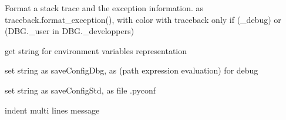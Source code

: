 \documentclass[a4paper,10pt,english]{sphinxmanual}
\begin{document}

\begin{fulllineitems}
\label{\detokenize{apidoc_src/src:src.debug.format_color_exception}}
Format a stack trace and the exception information.
as traceback.format\_exception(), with color
with traceback only if (\_debug) or (DBG.\_user in DBG.\_developpers)

\end{fulllineitems}


\begin{fulllineitems}
\label{\detokenize{apidoc_src/src:src.debug.getLocalEnv}}
get string for environment variables representation

\end{fulllineitems}


\begin{fulllineitems}
\label{\detokenize{apidoc_src/src:src.debug.getStrConfigDbg}}
set string as saveConfigDbg, 
as (path expression evaluation) for debug

\end{fulllineitems}


\begin{fulllineitems}
\label{\detokenize{apidoc_src/src:src.debug.getStrConfigStd}}
set string as saveConfigStd, 
as file .pyconf

\end{fulllineitems}


\begin{fulllineitems}
\label{\detokenize{apidoc_src/src:src.debug.indent}}
indent multi lines message

\end{fulllineitems}
\end{document}
